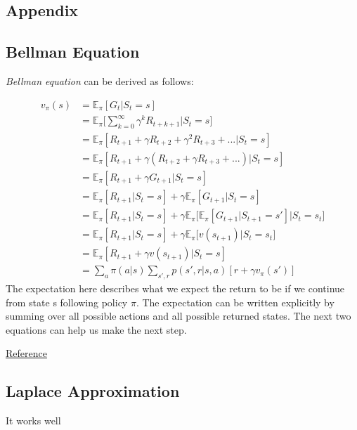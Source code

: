 \renewcommand{\thesection}{\Alph{section}.\arabic{section}}
\setcounter{section}{0}

\begin{appendices}
\chapter{Appendix}

\section{Bellman Equation}

\textit{Bellman equation} can be derived as follows:

\begin{align*}
	v_\pi(s) &= \mathbb{E}_\pi[G_t|S_t=s]\\
	& = \mathbb{E}_\pi\Bigg[\sum_{k=0}^{\infty}\gamma^k R_{t+k+1}\Big|S_t=s\Bigg]\\
	& = \mathbb{E}_\pi[R_{t+1} + \gamma R_{t+2} + \gamma^2 R_{t+3} + ...|S_t=s]\\
	& = \mathbb{E}_\pi[R_{t+1} + \gamma (R_{t+2} + \gamma R_{t+3} + ...)|S_t=s]\\
	& = \mathbb{E}_\pi[R_{t+1} + \gamma G_{t+1}|S_t=s]\\
	& = \mathbb{E}_\pi[R_{t+1}|S_t=s] + \gamma \mathbb{E}_\pi[ G_{t+1}|S_t=s]\\
	& = \mathbb{E}_\pi[R_{t+1}|S_t=s] + \gamma \mathbb{E}_\pi\Big[\mathbb{E}_\pi[ G_{t+1}|S_{t+1}=s']\Big|S_t = s_t\Big] \\
	& = \mathbb{E}_\pi[R_{t+1}|S_t=s] + \gamma \mathbb{E}_\pi\Big[v(s_{t+1})\Big|S_t = s_t\Big]\\
	& = \mathbb{E}_\pi[R_{t+1} + \gamma v(s_{t+1})|S_t=s]\\
	& = \sum_{a}\pi(a|s)\sum_{s',r}p(s',r|s,a)[r + \gamma v_\pi(s')]
\end{align*}
The expectation here describes what we expect the return to be if we continue from state s following policy $\pi$. The expectation can be written explicitly by summing over all possible actions and all possible returned states. The next two equations can help us make the next step.

\href{https://stats.stackexchange.com/questions/243384/deriving-bellmans-equation-in-reinforcement-learning}{Reference}

\section{Laplace Approximation}
It works well


\end{appendices}
